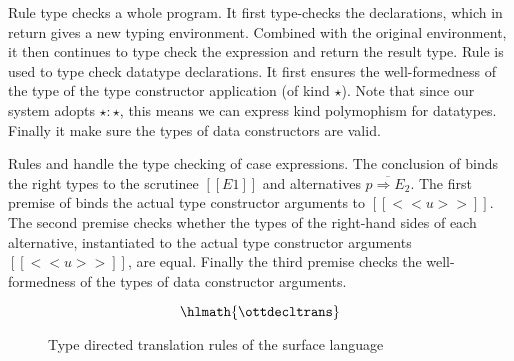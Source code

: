 Rule  type checks a whole program. It first
type-checks the declarations, which in return gives a new typing
environment. Combined with the original environment, it then continues
to type check the expression and return the result type. Rule
 is used to type check datatype declarations. It
first ensures the well-formedness of the type of the type constructor
application (of kind $\star$). Note that since our system adopts
$\star : \star$, this means we can express kind polymophism for
datatypes. Finally it make sure the types of data constructors are
valid.

Rules  and  handle the type
checking of case expressions. The conclusion of 
binds the right types to the scrutinee $[[E1]]$ and alternatives
$\overline{p \Rightarrow E_2}$. The first premise of
 binds the actual type constructor arguments to
$[[<<u>>]]$. The second premise checks whether the types of the
right-hand sides of each alternative, instantiated to the actual type
constructor arguments $[[<<u>>]]$, are equal. Finally the third
premise checks the well-formedness of the types of data constructor
arguments.


\begin{figure*}
\ottdefnctxtrans{}\ottinterrule
\ottdefnpgmtrans{}\ottinterrule
\ottdefndecltrans{}
\[\hlmath{\ottdecltrans}\]\ottinterrule %
\ottdefnpattrans{}\ottinterrule
\ottdefnexprtrans{}
\caption{Type directed translation rules of the surface language}
\label{fig:source:translate}
\end{figure*}




